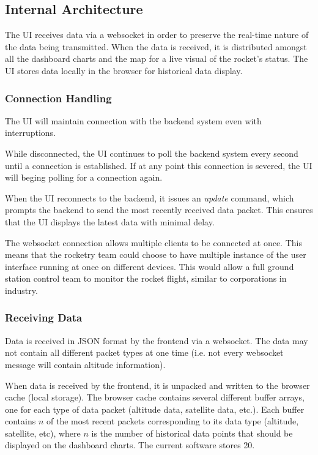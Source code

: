 \subsectionfont{\fontsize{14}{14}\selectfont}
\subsection{Internal Architecture}

The UI receives data via a websocket in order to preserve the real-time nature of the data being transmitted. When the data
is received, it is distributed amongst all the dashboard charts and the map for a live visual of the rocket's status. The UI 
stores data locally in the browser for historical data display.

\subsubsection{Connection Handling}
The UI will maintain connection with the backend system even with interruptions.

While disconnected, the UI continues to poll the backend system every second
until a connection is established. If at any point this connection is severed,
the UI will beging polling for a connection again.

When the UI reconnects to the backend, it issues an \emph{update} command, which prompts the backend to send the most recently
received data packet. This ensures that the UI displays the latest data with minimal delay.

The websocket connection allows multiple clients to be connected at once. This means
that the rocketry team could choose to have multiple instance of the user interface
running at once on different devices. This would allow a full ground station control team
to monitor the rocket flight, similar to corporations in industry.

\subsubsection{Receiving Data}

Data is received in JSON format by the frontend via a websocket. The data may not contain all different packet types
at one time (i.e. not every websocket message will contain altitude information).

When data is received by the frontend, it is unpacked and written to the browser cache (local storage). The browser cache
contains several different buffer arrays, one for each type of data packet (altitude data, satellite data, etc.). Each buffer
contains $n$ of the most recent packets corresponding to its data type (altitude, satellite, etc), where $n$ is the number of
historical data points that should be displayed on the dashboard charts. The current software stores 20.


